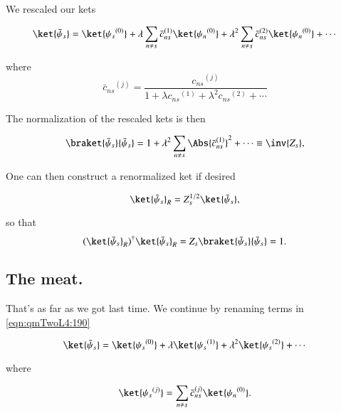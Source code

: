 We rescaled our kets 

\begin{equation}\label{eqn:qmTwoL4:190}
\ket{\bar{\psi}_s} 
=
\ket{{\psi_s}^{(0)}} 
+ 
\lambda
\sum_{n \ne s} {\bar{c}_{ns}}^{(1)} \ket{{\psi_n}^{(0)}} 
+
\lambda^2
\sum_{n \ne s} {\bar{c}_{ns}}^{(2)} \ket{{\psi_n}^{(0)}} 
+ \cdots
\end{equation}

where
\begin{equation}\label{eqn:qmTwoL4:210}
{\bar{c}_{ns}}^{(j)} = 
\frac{{c_{ns}}^{(j)}}
{
1 
+ \lambda {c_{ns}}^{(1)} 
+ \lambda^2 {c_{ns}}^{(2)} 
+ \cdots
}
\end{equation}

The normalization of the rescaled kets is then

\begin{equation}\label{eqn:qmTwoL4:230}
\braket{\bar{\psi}_s}{\bar{\psi}_s} 
=
1
+ 
\lambda^2
\sum_{n \ne s} \Abs{{\bar{c}_{ns}}^{(1)}}^2
+
\cdots
\equiv \inv{Z_s},
\end{equation}

One can then construct a renormalized ket if desired

\begin{equation}\label{eqn:qmTwoL4:250}
\ket{\bar{\psi}_s}_R = Z_s^{1/2} \ket{\bar{\psi}_s},
\end{equation}

so that
\begin{equation}\label{eqn:qmTwoL4:270}
(\ket{\bar{\psi}_s}_R)^\dagger \ket{\bar{\psi}_s}_R = Z_s \braket{\bar{\psi}_s}{\bar{\psi}_s} = 1.
\end{equation}

\subsection{The meat.}

That's as far as we got last time.  We continue by renaming terms in \ref{eqn:qmTwoL4:190}

\begin{equation}\label{eqn:qmTwoL4:300}
\ket{\bar{\psi}_s} 
=
\ket{{\psi_s}^{(0)}} 
+ 
\lambda \ket{{\psi_s}^{(1)}} 
+ 
\lambda^2 \ket{{\psi_s}^{(2)}} 
+ \cdots
\end{equation}

where

\begin{equation}\label{eqn:qmTwoL4:320}
\ket{{\psi_s}^{(j)}} = \sum_{n \ne s} {\bar{c}_{ns}}^{(j)} \ket{{\psi_n}^{(0)}}.
\end{equation}

